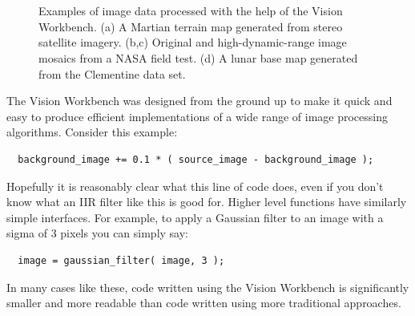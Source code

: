 \begin{figure}[p]
\centering
  \\
  \hfil
  \\
\caption{Examples of image data processed with the help of the Vision Workbench.  (a) A Martian terrain map generated from 
stereo satellite imagery.  (b,c) Original and high-dynamic-range image mosaics from a NASA field test.  (d) A lunar 
base map generated from the Clementine data set. }
\label{fig:examples}
\end{figure}

The Vision Workbench was designed from the ground up to make it quick
and easy to produce efficient implementations of a wide range of image
processing algorithms.  Consider this example:
\begin{verbatim}
  background_image += 0.1 * ( source_image - background_image );
\end{verbatim}
Hopefully it is reasonably clear what this line of code does, even 
if you don't know what an IIR filter like this is good for.  Higher 
level functions have similarly simple interfaces.  For example, to 
apply a Gaussian filter to an image with a sigma of 3 pixels you 
can simply say:
\begin{verbatim}
  image = gaussian_filter( image, 3 );
\end{verbatim}
In many cases like these, code written using the Vision Workbench is
significantly smaller and more readable than code written using more
traditional approaches.

